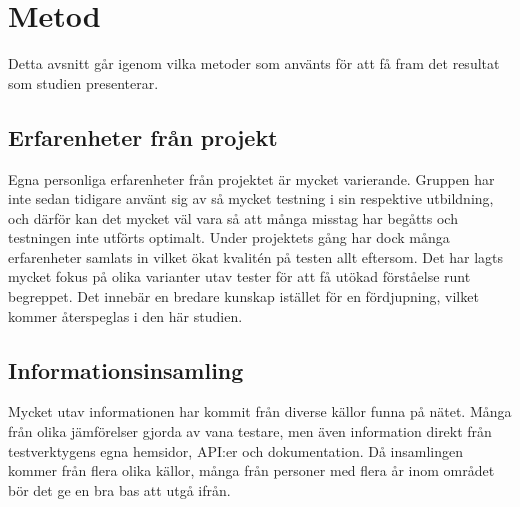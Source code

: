 \section{Metod}
\label{sec:david-method}
Detta avsnitt går igenom vilka metoder som använts för att få fram det resultat som studien presenterar.


\subsection{Erfarenheter från projekt}
Egna personliga erfarenheter från projektet är mycket varierande. Gruppen har inte sedan tidigare använt sig av så mycket testning i sin respektive utbildning, och därför kan det mycket väl vara så att många misstag har begåtts och testningen inte utförts optimalt. Under projektets gång har dock många erfarenheter samlats in vilket ökat kvalitén på testen allt eftersom. Det har lagts mycket fokus på olika varianter utav tester för att få utökad förståelse runt begreppet. Det innebär en bredare kunskap istället för en fördjupning, vilket kommer återspeglas i den här studien.

\subsection{Informationsinsamling}
Mycket utav informationen har kommit från diverse källor funna på nätet. Många från olika jämförelser gjorda av vana testare, men även information direkt från testverktygens egna hemsidor, API:er och dokumentation. Då insamlingen kommer från flera olika källor, många från personer med flera år inom området bör det ge en bra bas att utgå ifrån.